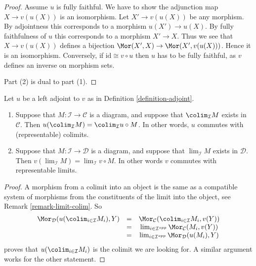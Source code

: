 \begin{proof}
Assume $u$ is fully faithful. We have to show the adjunction map
$X \to v(u(X))$ is an isomorphism. Let $X' \to v(u(X))$ be any morphism.
By adjointness this corresponds to a morphism $u(X') \to u(X)$. By fully
faithfulness of $u$ this corresponds to a morphism $X' \to X$. Thus we
see that $X \to v(u(X))$ defines a bijection
$\Mor(X', X) \to \Mor(X', v(u(X)))$. Hence it is an isomorphism.
Conversely, if $\text{id} \cong v \circ u$ then $u$ has to be fully
faithful, as $v$ defines an inverse on morphism sets.

\medskip\noindent
Part (2) is dual to part (1).
\end{proof}

\begin{lemma}
\label{lemma-adjoint-exact}
Let $u$ be a left adjoint to $v$ as in Definition \ref{definition-adjoint}.
\begin{enumerate}
\item Suppose that $M : \mathcal{I} \to \mathcal{C}$ is a diagram,
and suppose that $\colim_\mathcal{I} M$ exists in
$\mathcal{C}$. Then $u(\colim_\mathcal{I} M) =
\colim_\mathcal{I} u \circ M$. In other words,
$u$ commutes with (representable) colimits.
\item Suppose that $M : \mathcal{I} \to \mathcal{D}$ is a diagram,
and suppose that $\lim_\mathcal{I} M$ exists in
$\mathcal{D}$. Then $v(\lim_\mathcal{I} M) =
\lim_\mathcal{I} v \circ M$. In other words $v$ commutes
with representable limits.
\end{enumerate}
\end{lemma}

\begin{proof}
A morphism from a colimit into an object is the same as a compatible
system of morphisms from the constituents of the limit into the
object, see Remark \ref{remark-limit-colim}. So
$$
\begin{matrix}
\Mor_\mathcal{D}(u(\colim_{i \in \mathcal{I}} M_i), Y) &
= & \Mor_\mathcal{C}(\colim_{i \in \mathcal{I}} M_i, v(Y)) \\
& = &
\lim_{i \in \mathcal{I}^{opp}}
\Mor_\mathcal{C}(M_i, v(Y)) \\
& = &
\lim_{i \in \mathcal{I}^{opp}}
\Mor_\mathcal{D}(u(M_i), Y)
\end{matrix}
$$
proves that $u(\colim_{i \in \mathcal{I}} M_i)$ is
the colimit we are looking for.
A similar argument works for the other statement.
\end{proof}


